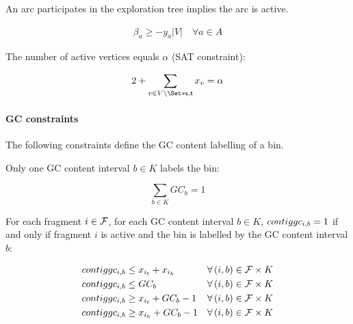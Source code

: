 An arc participates in the exploration tree implies the arc is active.
\begin{Constraint}
  \begin{align}
    \beta_a \geq - y_a |V| \quad \forall a \in A
    \label{pbf_iterbin:milp:cst:ccomp:tree_arc_active} %
  \end{align}
\end{Constraint}

The number of active vertices equals \(\alpha{}\) (SAT constraint):
\begin{Constraint}
  \begin{align}
    2 + \sum_{v \in V \setminus \Set*{\source{}, \sink{}}} x_v = \alpha
    \label{pbf_iterbin:milp:cst:ccomp:number_of_active_vertices} %
  \end{align}
\end{Constraint}

\paragraph{GC constraints}
%
The following constraints define the GC content labelling of a bin.

\phantom{text}

Only one GC content interval \(b \in K\) labels the bin:
\begin{Constraint}
  \begin{equation}
    \sum_{b \in K} GC_b = 1
    \label{pbf_iterbin:milp:cst:gc:exactly_one_gc_content_interval} %
  \end{equation}
\end{Constraint}

For each fragment \(i \in \mathcal{F}{}\), for each GC content interval \(b \in K\), \(contiggc_{i, b} = 1\) if and only if fragment \(i\) is active and the bin is labelled by the GC content interval \(b\):
\begin{Constraint}
  \begin{align}
    \contiggc{i}{b} & \leq x_{i_t} + x_{i_h} & \forall (i, b) \in \Fragments{} \times K \label{pbf_iterbin:milp:cst:gc:active_fragment_gc_1} \\ %
    \contiggc{i}{b} & \leq GC_b & \forall (i, b) \in \Fragments{} \times K \label{pbf_iterbin:milp:cst:gc:active_fragment_gc_2} \\ %
    \contiggc{i}{b} & \geq x_{i_t} + GC_b - 1 & \forall (i, b) \in \Fragments{} \times K \label{pbf_iterbin:milp:cst:gc:active_fragment_gc_3} \\ %
    \contiggc{i}{b} & \geq x_{i_h} + GC_b - 1 & \forall (i, b) \in \Fragments{} \times K \label{pbf_iterbin:milp:cst:gc:active_fragment_gc_4} %
  \end{align}
\end{Constraint}

